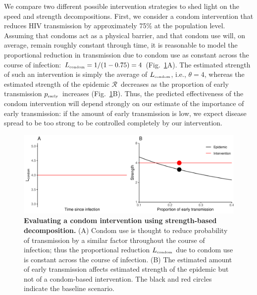 \documentclass[12pt]{article}
\newcommand{\comment}{}
\renewcommand{\comment}[3]{\textcolor{#1}{\textbf{[#2: }\textit{#3}\textbf{]}}}
\renewcommand{\comment}[3]{}
\newcommand{\jd}[1]{\comment{cyan}{JD}{#1}}
\newcommand{\RR}{\ensuremath{{\mathcal R}}}
\newcommand{\tsub}[2]{#1_{{\textrm{\tiny #2}}}}
\newcommand{\pEarly}{\ensuremath{\tsub{p}{early}}}
\newcommand{\figref}[1]{Fig.~\ref{fig:#1}}
\newcommand{\figlab}[1]{\label{fig:#1}}
\begin{document}
We compare two different possible intervention strategies to shed light on the speed and strength decompositions.
First, we consider a condom intervention that reduces HIV transmission by approximately 75\% at the population level.
Assuming that condoms act as a physical barrier, and that condom use will, on average, remain roughly constant through time, it is reasonable to model the proportional reduction in transmission due to condom use as constant across the course of infection: $\tsub{L}{condom} = 1/(1-0.75) = 4$ (\figref{condom}A).
The estimated strength of such an intervention is simply the average of $\tsub{L}{condom}$, i.e., $\theta=4$, whereas the estimated strength of the epidemic \RR\ decreases as the proportion of early transmission \pEarly\ increases (\figref{condom}B).
Thus, the predicted effectiveness of the condom intervention will depend strongly on our estimate of the importance of early transmission: if the amount of early transmission is low, we expect disease spread to be too strong to be controlled completely by our intervention.

\begin{figure}[!t]
\includegraphics[width=\textwidth]{../figure/condom.pdf}
\caption{
\textbf{Evaluating a condom intervention using strength-based decomposition.}
(A) Condom use is thought to reduce probability of transmission by a similar factor throughout the course of infection; thus the proportional reduction $\tsub{L}{condom}$ due to condom use is constant across the course of infection.
(B) The estimated amount of early transmission affects estimated strength of the epidemic but not of a condom-based intervention.
The black and red circles indicate the baseline scenario.
}
\figlab{condom}
\end{figure}

\jd{For next version, consider making \figref{condom} a four-panel figure like \figref{test}.}
\end{document}
